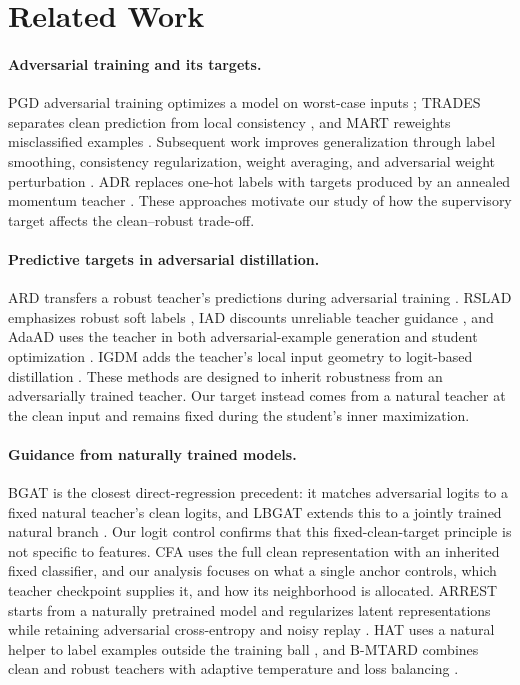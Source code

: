 \section{Related Work}
\label{sec:related}

\paragraph{Adversarial training and its targets.}
PGD adversarial training optimizes a model on worst-case inputs \citep{PGD}; TRADES separates clean
prediction from local consistency \citep{TRADES}, and MART reweights misclassified examples
\citep{MART}. Subsequent work improves generalization through label smoothing, consistency
regularization, weight averaging, and adversarial weight perturbation
\citep{pang2020bag,tack2022consistency,robustoverfit,2020_awp}. ADR replaces one-hot labels with
targets produced by an annealed momentum teacher \citep{adr}. These approaches motivate our study
of how the supervisory target affects the clean--robust trade-off.

\paragraph{Predictive targets in adversarial distillation.}
ARD transfers a robust teacher's predictions during adversarial training \citep{ard}. RSLAD emphasizes
robust soft labels \citep{rslad}, IAD discounts unreliable teacher guidance \citep{iad}, and AdaAD uses
the teacher in both adversarial-example generation and student optimization \citep{adaad}. IGDM adds
the teacher's local input geometry to logit-based distillation \citep{igdm}. These methods are designed
to inherit robustness from an adversarially trained teacher. Our target instead comes from a natural
teacher at the clean input and remains fixed during the student's inner maximization.

\paragraph{Guidance from naturally trained models.}
BGAT is the closest direct-regression precedent: it matches adversarial logits to a fixed natural
teacher's clean logits, and LBGAT extends this to a jointly trained natural branch \citep{lbgat}.
Our logit control confirms that this fixed-clean-target principle is not specific to features. CFA
uses the full clean representation with an inherited fixed classifier, and our analysis focuses on
what a single anchor controls, which teacher checkpoint supplies it, and how its neighborhood is
allocated. ARREST starts
from a naturally pretrained model and regularizes latent representations while retaining adversarial
cross-entropy and noisy replay \citep{arrest}. HAT uses a natural helper to label examples outside the
training ball \citep{hat}, and B-MTARD combines clean and robust teachers with adaptive temperature
and loss balancing \citep{bmtard}.

